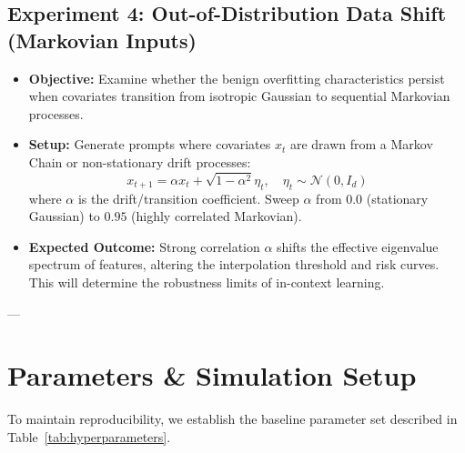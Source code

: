 \documentclass[11pt,a4paper]{article}
\begin{document}
\subsection{Experiment 4: Out-of-Distribution Data Shift (Markovian Inputs)}
\begin{itemize}
    \item \textbf{Objective:} Examine whether the benign overfitting characteristics persist when covariates transition from isotropic Gaussian to sequential Markovian processes.
    \item \textbf{Setup:} Generate prompts where covariates $x_t$ are drawn from a Markov Chain or non-stationary drift processes:
    \begin{equation}
        x_{t+1} = \alpha x_t + \sqrt{1 - \alpha^2} \eta_t, \quad \eta_t \sim \mathcal{N}(0, I_d)
    \end{equation}
    where $\alpha$ is the drift/transition coefficient. Sweep $\alpha$ from $0.0$ (stationary Gaussian) to $0.95$ (highly correlated Markovian).
    \item \textbf{Expected Outcome:} Strong correlation $\alpha$ shifts the effective eigenvalue spectrum of features, altering the interpolation threshold and risk curves. This will determine the robustness limits of in-context learning.
\end{itemize}

---

\section{Parameters \& Simulation Setup}

To maintain reproducibility, we establish the baseline parameter set described in Table~\ref{tab:hyperparameters}.
\end{document}

